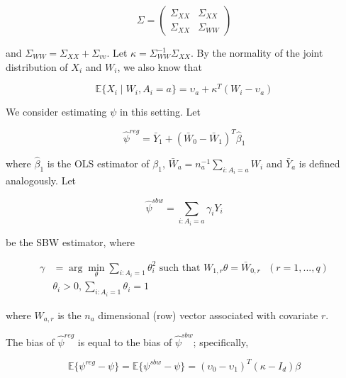 $$
\Sigma = \begin{pmatrix} 
\Sigma_{XX} & \Sigma_{XX} \\ 
\Sigma_{XX} & \Sigma_{WW}  
\end{pmatrix}
$$ 

and $\Sigma_{WW} = \Sigma_{XX} + \Sigma_{vv}$. Let $\kappa = \Sigma_{WW}^{-1}\Sigma_{XX}$. By the normality of the joint distribution of $X_i$ and $W_i$, we also know that

\begin{equation}
\mathbb{E}\{X_i \mid W_i, A_i = a\} = \upsilon_a + \kappa^T(W_i - \upsilon_a)
\end{equation}

We consider estimating $\psi$ in this setting. Let 

$$
\hat{\psi}^{reg} = \bar{Y}_1 + (\bar{W}_0 - \bar{W}_1)^T\hat{\beta}_1
$$ 

where $\hat{\beta}_1$ is the OLS estimator of $\beta_1$, $\bar{W}_a = n_a^{-1}\sum_{i:A_i = a} W_i$ and $\bar{Y}_a$ is defined analogously. Let 

$$
\hat{\psi}^{sbw} = \sum_{i: A_i = a} \gamma_i Y_i
$$ 

be the SBW estimator, where

\begin{align*}
\gamma &= \arg\min_{\theta} \sum_{i: A_i = 1}\theta_i^2 \text{ such that } W_{1, r}\theta = \bar{W}_{0, r} \ \ \ (r = 1, ..., q) \\
&\theta_i > 0, \sum_{i: A_i = 1}\theta_i = 1
\end{align*}

where $W_{a, r}$ is the $n_a$ dimensional (row) vector associated with covariate $r$.

\begin{proposition}\label{cl1}
The bias of $\hat{\psi}^{reg}$ is equal to the bias of $\hat{\psi}^{sbw}$; specifically, 

$$
\mathbb{E}\{\psi^{reg} - \psi\} = \mathbb{E}\{\psi^{sbw} - \psi\} = (\upsilon_0 - \upsilon_1)^T(\kappa - I_d)\beta
$$
\end{proposition}

